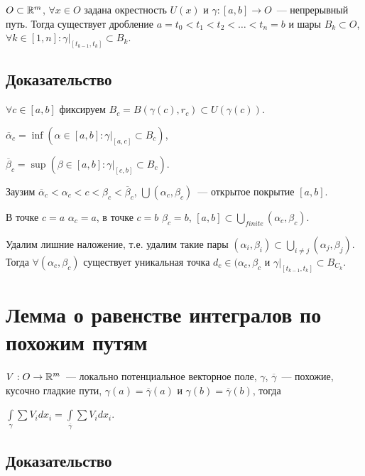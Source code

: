 \documentclass{article}
\begin{document}
        $O \subset \mathbb{R}^m$, $\forall x \in O$ задана окрестность $U(x)$ и $\gamma : [a, b] \rightarrow O$~--- непрерывный путь. Тогда существует дробление $a = t_0 < t_1 < t_2 < \ldots < t_n = b$ и шары $B_k \subset O$, $\forall k \in [1, n] : \gamma \big|_{[t_{k - 1}, t_k]} \subset B_k$.
        
        \subsection{Доказательство}
        
            $\forall c \in [a, b]$ фиксируем $B_c = B \left( \gamma(c), r_c \right) \subset U \left( \gamma (c) \right)$.
            
            $\overline{\alpha}_c = \inf \left( \alpha \in [a, b] : \gamma \bigg|_{[a, c]} \subset B_c \right)$,
            
            $\overline{\beta}_c = \sup \left( \beta \in [a, b] : \gamma \bigg|_{[c, b]} \subset B_c \right)$.
            
            Заузим $\overline{\alpha}_c < \alpha_c < c < \beta_c < \overline{\beta}_c$, $\bigcup ( \alpha_c, \beta_c )$~--- открытое покрытие $[a, b]$.
            
            В точке $c = a$ $\alpha_c = a$, в точке $c = b$ $\beta_c = b$, $[a, b] \subset \bigcup\limits_{finite} \left( \alpha_c, \beta_c \right)$. 
            
            Удалим лишние наложение, т.е. удалим такие пары $(\alpha_i, \beta_i) \subset \bigcup\limits_{i \neq j} (\alpha_j, \beta_j)$. Тогда $\forall (\alpha_c, \beta_c)$ существует уникальная точка $d_c \in (\alpha_c, \beta_c$ и $\gamma \bigg|_{[t_{k - 1}, t_k]} \subset B_{C_k}$.
            
    \newpage
    
    \section{Лемма о равенстве интегралов по похожим путям}
    
        $V : O \rightarrow \mathbb{R}^m$~--- локально потенциальное векторное поле, $\gamma$, $\overline{\gamma}$~--- похожие, кусочно гладкие пути, $\gamma(a) = \overline{\gamma}(a)$ и $\gamma(b) = \overline{\gamma}(b)$, тогда
        
        $\int\limits_{\gamma} \sum V_i dx_i = \int\limits_{\overline{\gamma}} \sum V_i dx_i$.
        
        \subsection{Доказательство}
        
\end{document}
